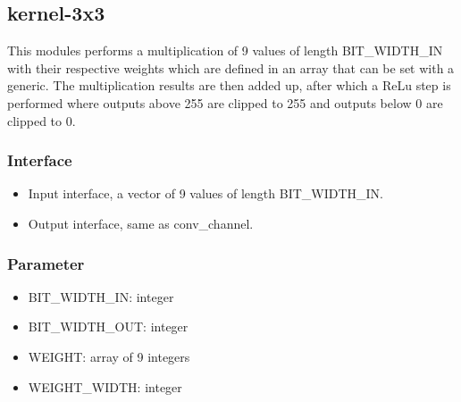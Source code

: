 \subsection{kernel-3x3}
This modules performs a multiplication of 9 values of length BIT\_WIDTH\_IN with their respective weights which are defined in an
array that can be set with a generic. The multiplication results are then added up, after which a ReLu step is performed where outputs
above 255 are clipped to 255 and outputs below 0 are clipped to 0.
\subsubsection{Interface}
\begin{itemize}
	\item Input interface, a vector of 9 values of length BIT\_WIDTH\_IN.
	\item Output interface, same as conv\_channel.
\end{itemize}
\subsubsection{Parameter}
\begin{itemize}
	\item BIT\_WIDTH\_IN: integer
	\item BIT\_WIDTH\_OUT: integer
	\item WEIGHT: array of 9 integers
	\item WEIGHT\_WIDTH: integer
\end{itemize}